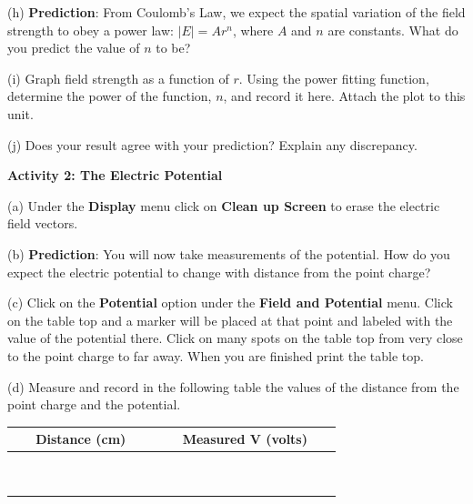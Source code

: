 (h) \textbf{Prediction}: From Coulomb's Law, we expect the spatial variation
of the field strength to obey a power law: \( \left| E\right| =Ar^{n} \),
where \( A \) and \( n \) are constants. What do you predict the value of 
\( n \) to be?\vspace{15mm}

(i) Graph field strength as a function of $r$. Using the power fitting
function, determine the power of the function, $n$, and record it here.
Attach the plot to this unit.
\vspace{15mm}

(j) Does your result agree with your prediction? Explain any discrepancy.
\vspace{15mm}

\vspace{0.5in}
\textbf{Activity 2: The Electric Potential}

(a) Under the {\bf Display} menu click on {\bf Clean up Screen} to erase the
electric field vectors.

(b) \textbf{Prediction}: You will now take measurements of the potential.
How do you expect the electric potential to change with distance from the point
charge?
\vspace{15mm}
 
(c) Click on the \textbf{Potential} option under the \textbf{Field and Potential} menu. Click on the table top and a marker will be
placed at that point and labeled with the value of the potential there.
Click on many spots on the table top from very close to the point charge to
far away.
When you are finished print the table top.
\vspace{5mm}

(d) Measure and record in the following table the values of the distance from the point charge and the potential.

\vspace{0.3cm}
{\centering \begin{tabular}{|c|c|}
\hline 
~~~Distance (cm)~~~&
~~~Measured V (volts)~~~\\
\hline
\hline 
&
\\
\hline 
&
\\
\hline 
&
\\
\hline 
&
\\
\hline 
&
\\
\hline 
&
\\
\hline 
&
\\
\hline 
&
\\
\hline 
&
\\
\hline
\end{tabular}\par}
\vspace{0.3cm}


